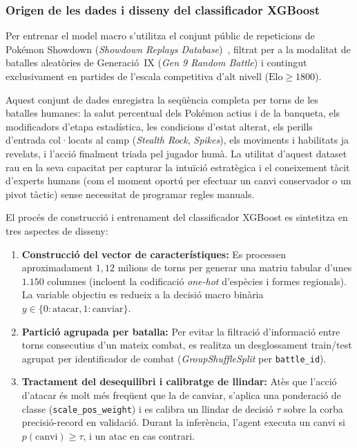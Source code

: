 \subsubsection*{Origen de les dades i disseny del classificador XGBoost}

Per entrenar el model macro s'utilitza el conjunt públic de repeticions de Pokémon Showdown (\textit{Showdown Replays Database})~\cite{showdown_replays}, filtrat per a la modalitat de batalles aleatòries de Generació~IX (\textit{Gen 9 Random Battle}) i contingut exclusivament en partides de l'escala competitiva d'alt nivell ($\text{Elo} \ge 1800$).

Aquest conjunt de dades enregistra la seqüència completa per torns de les batalles humanes: la salut percentual dels Pokémon actius i de la banqueta, els modificadors d'etapa estadística, les condicions d'estat alterat, els perills d'entrada col·locats al camp (\textit{Stealth Rock}, \textit{Spikes}), els moviments i habilitats ja revelats, i l'acció finalment triada pel jugador humà. La utilitat d'aquest dataset rau en la seva capacitat per capturar la intuïció estratègica i el coneixement tàcit d'experts humans (com el moment oportú per efectuar un canvi conservador o un pivot tàctic) sense necessitat de programar regles manuals.

El procés de construcció i entrenament del classificador XGBoost es sintetitza en tres aspectes de disseny:
\begin{enumerate}
    \item \textbf{Construcció del vector de característiques:} Es processen aproximadament $1{,}12$ milions de torns per generar una matriu tabular d'unes $1.150$ columnes (incloent la codificació \textit{one-hot} d'espècies i formes regionals). La variable objectiu es redueix a la decisió macro binària $y \in \{0: \text{atacar}, 1: \text{canviar}\}$.
    \item \textbf{Partició agrupada per batalla:} Per evitar la filtració d'informació entre torns consecutius d'un mateix combat, es realitza un desglossament train/test agrupat per identificador de combat (\textit{GroupShuffleSplit} per \texttt{battle\_id}).
    \item \textbf{Tractament del desequilibri i calibratge de llindar:} Atès que l'acció d'atacar és molt més freqüent que la de canviar, s'aplica una ponderació de classe (\texttt{scale\_pos\_weight}) i es calibra un llindar de decisió $\tau$ sobre la corba precisió-record en validació. Durant la inferència, l'agent executa un canvi si $p(\text{canvi}) \ge \tau$, i un atac en cas contrari.
\end{enumerate}

